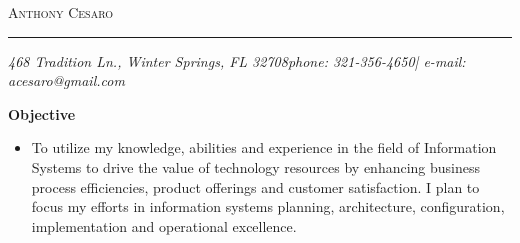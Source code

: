 \documentclass[10pt,oneside]{article}
\makeatletter
\newcommand{\name}{Anthony Cesaro}
\newcommand{\email}{acesaro@gmail.com}
\newcommand{\addr}{468 Tradition Ln., Winter Springs, FL 32708}
\newcommand{\phone}{321-356-4650}
\newcommand{\bigname}[1]{
	\begin{flushleft}\selectfont\Large\scshape#1\end{flushleft}
}
\newenvironment{ressection}[1]{
	\vspace{4pt}
	\textbf{\selectfont\normalsize#1}
	\begin{itemize}
	\vspace{3pt}
}{
	\end{itemize}
}
\newcommand{\resitem}[1]{
	\vspace{-4pt}
	\item \begin{flushleft} #1 \end{flushleft}
}
\makeatother
\begin{document}
 \selectfont

\bigname{\name}

\vspace{-8pt} \rule{\textwidth}{1pt}

\vspace{-1pt} {\small\itshape \addr \hfill phone: \phone | e-mail: \email}

\vspace{8 pt}


\begin{ressection}{Objective}

	\resitem{To utilize my knowledge, abilities and experience in the field of Information Systems to drive the value of technology resources by enhancing business process efficiencies, product offerings and customer satisfaction.  I plan to focus my efforts in information systems planning, architecture, configuration, implementation and operational excellence.}

\end{ressection}

\end{document}
